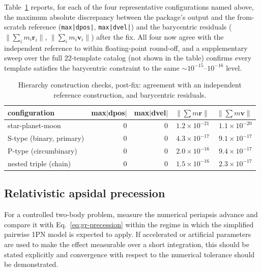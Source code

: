\documentclass[11pt]{article}
\begin{document}
Table~\ref{tab:hierarchy-checks} reports, for each of the four representative
configurations named above, the maximum absolute discrepancy between the
package's output and the from-scratch reference (\texttt{max|dpos|},
\texttt{max|dvel|}) and the barycentric residuals
($\lVert\sum_i m_i \bm r_i\rVert$, $\lVert\sum_i m_i \bm v_i\rVert$) after the
fix. All four now agree with the independent reference to within floating-point
round-off, and a supplementary sweep over the full 22-template catalog
(not shown in the table) confirms every template satisfies the barycentric
constraint to the same $\sim 10^{-15}$--$10^{-16}$ level.

\begin{table}[h]
    \centering
    \caption{Hierarchy construction checks, post-fix: agreement with an
    independent reference construction, and barycentric residuals.}
    \label{tab:hierarchy-checks}
    \begin{tabular}{lrrrr}
        \toprule
        configuration & max$|$d\textbf{pos}$|$ & max$|$d\textbf{vel}$|$ & $\lVert\sum m\bm r\rVert$ & $\lVert\sum m\bm v\rVert$ \\
        \midrule
        star-planet-moon         & $0$ & $0$ & $1.2\times10^{-21}$ & $1.1\times10^{-20}$ \\
        S-type (binary, primary) & $0$ & $0$ & $4.3\times10^{-17}$ & $9.1\times10^{-17}$ \\
        P-type (circumbinary)    & $0$ & $0$ & $2.0\times10^{-16}$ & $9.4\times10^{-17}$ \\
        nested triple (chain)    & $0$ & $0$ & $1.5\times10^{-16}$ & $2.3\times10^{-17}$ \\
        \bottomrule
    \end{tabular}
\end{table}


\subsection{Relativistic apsidal precession}

For a controlled two-body problem, measure the numerical periapsis advance
and compare it with Eq.~\eqref{eq:gr-precession} within the regime in which
the simplified pairwise 1PN model is expected to apply. If accelerated or
artificial parameters are used to make the effect measurable over a short
integration, this should be stated explicitly and convergence with respect
to the numerical tolerance should be demonstrated.
\end{document}
